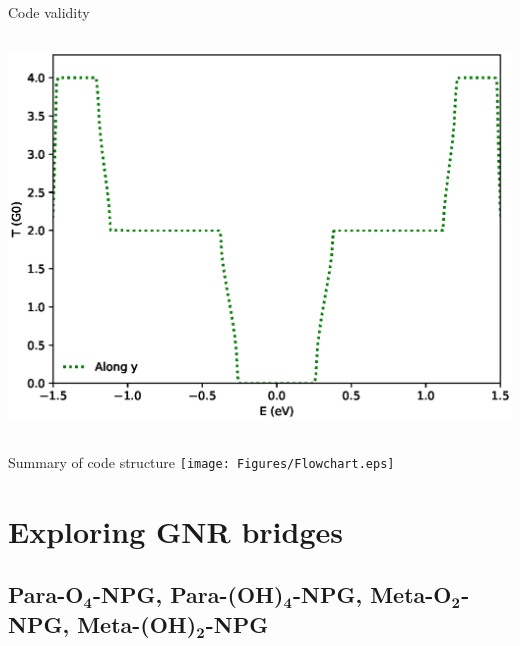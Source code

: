 \documentclass[hyperref={colorlinks=true,urlcolor=blue,linkcolor=.},aspectratio=1610,mathserif]{beamer}
\newcommand*\mathinhead[2]{\texorpdfstring{$\boldsymbol{#1}$}{#2}}
\begin{document}
\begin{frame}{Code validity}
\begin{overprint}
\begin{columns}[t]
			\includegraphics[width=.87\textwidth]{Figures/txy_AVER.eps}
		\end{columns}
	\end{overprint}
\end{frame}

\begin{frame}{Summary of code structure}
	\centering
	\texttt{[image: Figures/Flowchart.eps]}
\end{frame}

\section{Exploring GNR bridges}
\subsection{Para-O\mathinhead{_4}{_4}-NPG, Para-(OH)\mathinhead{_4}{_4}-NPG, Meta-O\mathinhead{_2}{_2}-NPG, Meta-(OH)\mathinhead{_2}{_2}-NPG}
\end{document}
